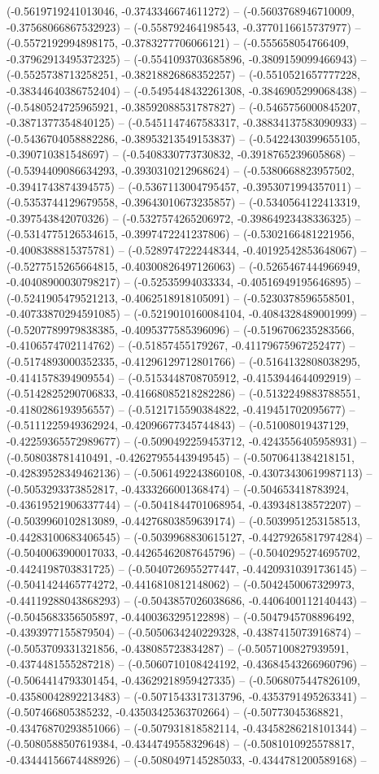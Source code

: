 (-0.5619719241013046, -0.3743346674611272) -- (-0.5603768946710009, -0.37568066867532923) -- (-0.558792464198543, -0.3770116615737977) -- (-0.5572192994898175, -0.3783277706066121) -- (-0.555658054766409, -0.37962913495372325) -- (-0.5541093703685896, -0.3809159099466943) -- (-0.5525738713258251, -0.38218826868352257) -- (-0.5510521657777228, -0.38344640386752404) -- (-0.5495448432261308, -0.3846905299068438) -- (-0.5480524725965921, -0.38592088531787827) -- (-0.5465756000845207, -0.3871377354840125) -- (-0.5451147467583317, -0.38834137583090933) -- (-0.5436704058882286, -0.38953213549153837) -- (-0.5422430399655105, -0.390710381548697) -- (-0.5408330773730832, -0.3918765239605868) -- (-0.5394409086634293, -0.3930310212968624) -- (-0.5380668823957502, -0.3941743874394575) -- (-0.5367113004795457, -0.3953071994357011) -- (-0.5353744129679558, -0.39643010673235857) -- (-0.5340564122413319, -0.397543842070326) -- (-0.5327574265206972, -0.39864923438336325) -- (-0.5314775126534615, -0.3997472241237806) -- (-0.5302166481221956, -0.4008388815375781) -- (-0.5289747222448344, -0.40192542853648067) -- (-0.5277515265664815, -0.40300826497126063) -- (-0.5265467444966949, -0.40408900030798217) -- (-0.52535994033334, -0.40516949195646895) -- (-0.5241905479521213, -0.4062518918105091) -- (-0.5230378596558501, -0.40733870294591085) -- (-0.5219010160084104, -0.4084328489001999) -- (-0.5207789979838385, -0.4095377585396096) -- (-0.5196706235283566, -0.4106574702114762) -- (-0.51857455179267, -0.41179675967252477) -- (-0.5174893000352335, -0.41296129712801766) -- (-0.5164132808038295, -0.4141578394909554) -- (-0.5153448708705912, -0.4153944644092919) -- (-0.5142825290706833, -0.41668085218282286) -- (-0.5132249883788551, -0.4180286193956557) -- (-0.5121715590384822, -0.419451702095677) -- (-0.5111225949362924, -0.42096677345744843) -- (-0.51008019437129, -0.42259365572989677) -- (-0.5090492259453712, -0.4243556405958931) -- (-0.508038781410491, -0.42627955443949545) -- (-0.5070641384218151, -0.42839528349462136) -- (-0.5061492243860108, -0.43073430619987113) -- (-0.5053293373852817, -0.4333266001368474) -- (-0.504653418783924, -0.43619521906337744) -- (-0.5041844701068954, -0.439348138572207) -- (-0.5039960102813089, -0.44276803859639174) -- (-0.5039951253158513, -0.44283100683406545) -- (-0.5039968830615127, -0.44279265817974284) -- (-0.5040063900017033, -0.44265462087645796) -- (-0.5040295274695702, -0.4424198703831725) -- (-0.5040726955277447, -0.44209310391736145) -- (-0.5041424465774272, -0.4416810812148062) -- (-0.5042450067329973, -0.44119288043868293) -- (-0.5043857026038686, -0.4406400112140443) -- (-0.5045683356505897, -0.4400363295122898) -- (-0.5047945708896492, -0.4393977155879504) -- (-0.5050634240229328, -0.4387415073916874) -- (-0.5053709331321856, -0.438085723834287) -- (-0.5057100827939591, -0.4374481555287218) -- (-0.5060710108424192, -0.43684543266960796) -- (-0.5064414793301454, -0.43629218959427335) -- (-0.5068075447826109, -0.43580042892213483) -- (-0.5071543317313796, -0.4353791495263341) -- (-0.507466805385232, -0.43503425363702664) -- (-0.50773045368821, -0.43476870293851066) -- (-0.507931818582114, -0.43458286218101344) -- (-0.5080588507619384, -0.4344749558329648) -- (-0.5081010925578817, -0.43444156674488926) -- (-0.5080497145285033, -0.4344781200589168) -- 